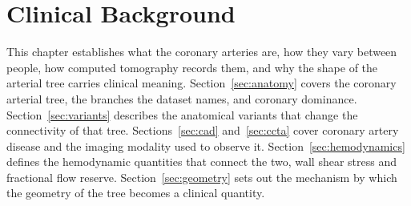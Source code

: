 
\section{Clinical Background}
\label{ch:clinical}

This chapter establishes what the coronary arteries are, how they vary between people, how
computed tomography records them, and why the shape of the arterial tree carries clinical
meaning.
Section~\ref{sec:anatomy} covers the coronary arterial tree, the branches the dataset names, and
coronary dominance.
Section~\ref{sec:variants} describes the anatomical variants that change the connectivity of
that tree.
Sections~\ref{sec:cad} and~\ref{sec:ccta} cover coronary artery disease and the imaging
modality used to observe it.
Section~\ref{sec:hemodynamics} defines the hemodynamic quantities that connect the two, wall shear
stress and fractional flow reserve.
Section~\ref{sec:geometry} sets out the mechanism by which the geometry of the tree becomes a
clinical quantity.
